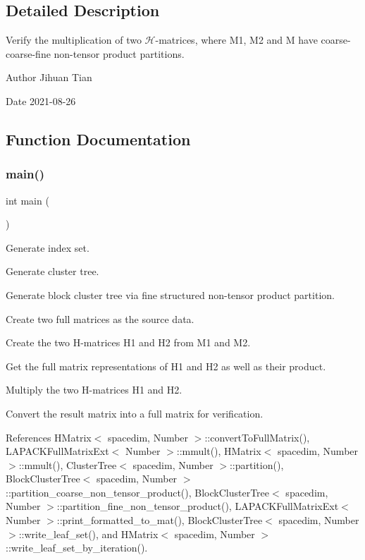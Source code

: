 \subsection{Detailed Description}
Verify the multiplication of two $\mathcal{H}$-\/matrices, where M1, M2 and M have coarse-\/coarse-\/fine non-\/tensor product partitions. 

\begin{DoxyAuthor}{Author}
Jihuan Tian 
\end{DoxyAuthor}
\begin{DoxyDate}{Date}
2021-\/08-\/26 
\end{DoxyDate}


\subsection{Function Documentation}
\mbox{\label{hmatrix-hmatrix-mmult-coarse-coarse-fine-ntp_8cc_ae66f6b31b5ad750f1fe042a706a4e3d4}} 
\subsubsection{\texorpdfstring{main()}{main()}}
{\footnotesize\ttfamily int main (\begin{DoxyParamCaption}{ }\end{DoxyParamCaption})}

Generate index set.

Generate cluster tree.

Generate block cluster tree via fine structured non-\/tensor product partition.

Create two full matrices as the source data.

Create the two H-\/matrices {\ttfamily H1} and {\ttfamily H2} from {\ttfamily M1} and {\ttfamily M2}.

Get the full matrix representations of {\ttfamily H1} and {\ttfamily H2} as well as their product.

Multiply the two H-\/matrices {\ttfamily H1} and {\ttfamily H2}.

Convert the result matrix into a full matrix for verification.

References H\+Matrix$<$ spacedim, Number $>$\+::convert\+To\+Full\+Matrix(), L\+A\+P\+A\+C\+K\+Full\+Matrix\+Ext$<$ Number $>$\+::mmult(), H\+Matrix$<$ spacedim, Number $>$\+::mmult(), Cluster\+Tree$<$ spacedim, Number $>$\+::partition(), Block\+Cluster\+Tree$<$ spacedim, Number $>$\+::partition\+\_\+coarse\+\_\+non\+\_\+tensor\+\_\+product(), Block\+Cluster\+Tree$<$ spacedim, Number $>$\+::partition\+\_\+fine\+\_\+non\+\_\+tensor\+\_\+product(), L\+A\+P\+A\+C\+K\+Full\+Matrix\+Ext$<$ Number $>$\+::print\+\_\+formatted\+\_\+to\+\_\+mat(), Block\+Cluster\+Tree$<$ spacedim, Number $>$\+::write\+\_\+leaf\+\_\+set(), and H\+Matrix$<$ spacedim, Number $>$\+::write\+\_\+leaf\+\_\+set\+\_\+by\+\_\+iteration().

